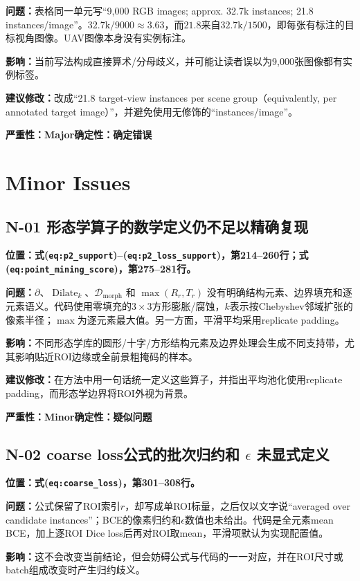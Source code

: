 \documentclass[UTF8,a4paper,11pt]{ctexart}
\newcommand{\sev}[1]{\textbf{严重性：#1}}
\newcommand{\cert}[1]{\textbf{确定性：#1}}
\newcommand{\loc}[1]{\textbf{位置：#1}}
\newcommand{\prob}{\textbf{问题：}}
\newcommand{\impact}{\textbf{影响：}}
\newcommand{\fix}{\textbf{建议修改：}}
\begin{document}
\prob 表格同一单元写“9,000 RGB images; approx. 32.7k instances; 21.8 instances/image”。$32.7\mathrm{k}/9000\approx3.63$，而$21.8$来自$32.7\mathrm{k}/1500$，即每张有标注的目标视角图像。UAV图像本身没有实例标注。

\impact 当前写法构成直接算术/分母歧义，并可能让读者误以为9,000张图像都有实例标签。

\fix 改成“21.8 target-view instances per scene group（equivalently, per annotated target image）”，并避免使用无修饰的“instances/image”。

\sev{Major}\quad \cert{确定错误}

\section*{Minor Issues}

\subsection*{N-01 形态学算子的数学定义仍不足以精确复现}
\loc{式(\texttt{eq:p2\_support})--(\texttt{eq:p2\_loss\_support})，第214--260行；式(\texttt{eq:point\_mining\_score})，第275--281行。}

\prob $\partial$、$\operatorname{Dilate}_k$、$\mathcal D_{\mathrm{morph}}$ 和 $\max(R_r,T_r)$ 没有明确结构元素、边界填充和逐元素语义。代码使用零填充的$3\times3$方形膨胀/腐蚀，$k$表示按Chebyshev邻域扩张的像素半径；$\max$为逐元素最大值。另一方面，平滑平均采用replicate padding。

\impact 不同形态学库的圆形/十字/方形结构元素及边界处理会生成不同支持带，尤其影响贴近ROI边缘或全前景粗掩码的样本。

\fix 在方法中用一句话统一定义这些算子，并指出平均池化使用replicate padding，而形态学边界将ROI外视为背景。

\sev{Minor}\quad \cert{疑似问题}

\subsection*{N-02 coarse loss公式的批次归约和 $\epsilon$ 未显式定义}
\loc{式(\texttt{eq:coarse\_loss})，第301--308行。}

\prob 公式保留了ROI索引$r$，却写成单ROI标量，之后仅以文字说“averaged over candidate instances”；BCE的像素归约和$\epsilon$数值也未给出。代码是全元素mean BCE，加上逐ROI Dice loss后再对ROI取mean，平滑项默认为实现配置值。

\impact 这不会改变当前结论，但会妨碍公式与代码的一一对应，并在ROI尺寸或batch组成改变时产生归约歧义。
\end{document}
